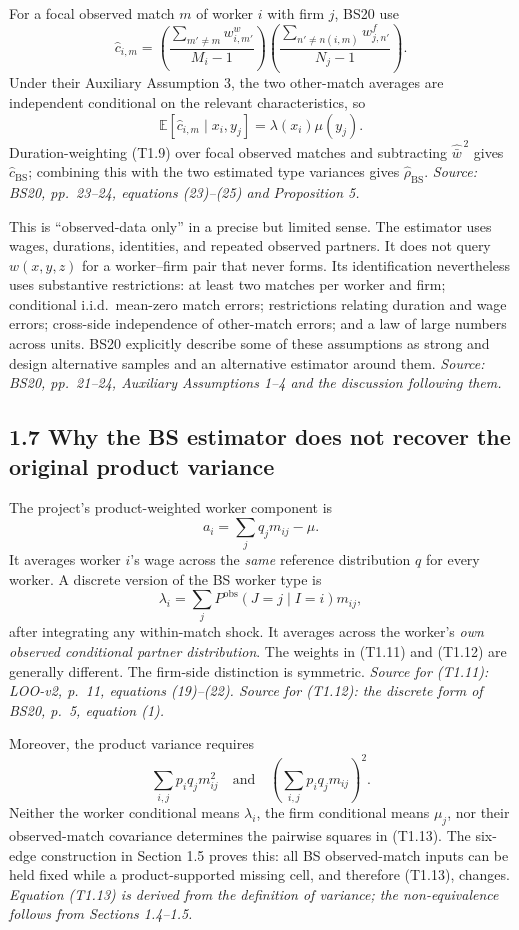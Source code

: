 \documentclass[11pt]{article}
\begin{document}
For a focal observed match \(m\) of worker \(i\) with firm \(j\), BS20 use
\[
\widehat c_{i,m}
=
\left(\frac{\sum_{m'\ne m}w^w_{i,m'}}{M_i-1}\right)
\left(\frac{\sum_{n'\ne n(i,m)}w^f_{j,n'}}{N_j-1}\right).
\tag{T1.9}
\]
Under their Auxiliary Assumption 3, the two other-match averages are
independent conditional on the relevant characteristics, so
\[
\mathbb E[\widehat c_{i,m}\mid x_i,y_j]
=\lambda(x_i)\mu(y_j).
\tag{T1.10}
\]
Duration-weighting (T1.9) over focal observed matches and subtracting
\(\widehat{\bar w}^{\,2}\) gives \(\widehat c_{\mathrm{BS}}\); combining this
with the two estimated type variances gives
\(\widehat\rho_{\mathrm{BS}}\).
\textit{Source: BS20, pp.\ 23--24, equations (23)--(25) and Proposition 5.}

This is ``observed-data only'' in a precise but limited sense.  The estimator
uses wages, durations, identities, and repeated observed partners.  It does
not query \(w(x,y,z)\) for a worker--firm pair that never forms.  Its
identification nevertheless uses substantive restrictions: at least two
matches per worker and firm; conditional i.i.d.\ mean-zero match errors;
restrictions relating duration and wage errors; cross-side independence of
other-match errors; and a law of large numbers across units.  BS20 explicitly
describe some of these assumptions as strong and design alternative samples
and an alternative estimator around them.
\textit{Source: BS20, pp.\ 21--24, Auxiliary Assumptions 1--4 and the
discussion following them.}

\subsection{1.7 Why the BS estimator does not recover the original product variance}

The project's product-weighted worker component is
\[
a_i
=\sum_jq_jm_{ij}-\mu.
\tag{T1.11}
\]
It averages worker \(i\)'s wage across the \emph{same} reference distribution
\(q\) for every worker.  A discrete version of the BS worker type is
\[
\lambda_i
=\sum_jP^{\mathrm{obs}}(J=j\mid I=i)m_{ij},
\tag{T1.12}
\]
after integrating any within-match shock.  It averages across the worker's
\emph{own observed conditional partner distribution}.  The weights in
(T1.11) and (T1.12) are generally different.  The firm-side distinction is
symmetric.
\textit{Source for (T1.11): LOO-v2, p.\ 11, equations (19)--(22).
Source for (T1.12): the discrete form of BS20, p.\ 5, equation (1).}

Moreover, the product variance requires
\[
\sum_{i,j}p_iq_jm_{ij}^2
\quad\text{and}\quad
\left(\sum_{i,j}p_iq_jm_{ij}\right)^2.
\tag{T1.13}
\]
Neither the worker conditional means \(\lambda_i\), the firm conditional means
\(\mu_j\), nor their observed-match covariance determines the pairwise
squares in (T1.13).  The six-edge construction in Section 1.5 proves this:
all BS observed-match inputs can be held fixed while a product-supported
missing cell, and therefore (T1.13), changes.
\textit{Equation (T1.13) is derived from the definition of variance; the
non-equivalence follows from Sections 1.4--1.5.}
\end{document}
